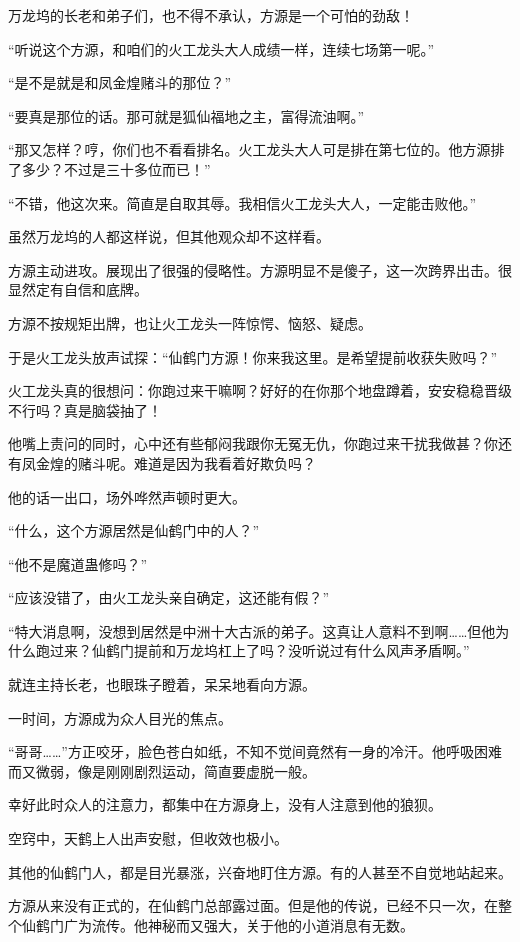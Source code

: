 \begin{this_body}
万龙坞的长老和弟子们，也不得不承认，方源是一个可怕的劲敌！

“听说这个方源，和咱们的火工龙头大人成绩一样，连续七场第一呢。”

“是不是就是和凤金煌赌斗的那位？”

“要真是那位的话。那可就是狐仙福地之主，富得流油啊。”

“那又怎样？哼，你们也不看看排名。火工龙头大人可是排在第七位的。他方源排了多少？不过是三十多位而已！”

“不错，他这次来。简直是自取其辱。我相信火工龙头大人，一定能击败他。”

虽然万龙坞的人都这样说，但其他观众却不这样看。

方源主动进攻。展现出了很强的侵略性。方源明显不是傻子，这一次跨界出击。很显然定有自信和底牌。

方源不按规矩出牌，也让火工龙头一阵惊愕、恼怒、疑虑。

于是火工龙头放声试探：“仙鹤门方源！你来我这里。是希望提前收获失败吗？”

火工龙头真的很想问：你跑过来干嘛啊？好好的在你那个地盘蹲着，安安稳稳晋级不行吗？真是脑袋抽了！

他嘴上责问的同时，心中还有些郁闷我跟你无冤无仇，你跑过来干扰我做甚？你还有凤金煌的赌斗呢。难道是因为我看着好欺负吗？

他的话一出口，场外哗然声顿时更大。

“什么，这个方源居然是仙鹤门中的人？”

“他不是魔道蛊修吗？”

“应该没错了，由火工龙头亲自确定，这还能有假？”

“特大消息啊，没想到居然是中洲十大古派的弟子。这真让人意料不到啊……但他为什么跑过来？仙鹤门提前和万龙坞杠上了吗？没听说过有什么风声矛盾啊。”

就连主持长老，也眼珠子瞪着，呆呆地看向方源。

一时间，方源成为众人目光的焦点。

“哥哥……”方正咬牙，脸色苍白如纸，不知不觉间竟然有一身的冷汗。他呼吸困难而又微弱，像是刚刚剧烈运动，简直要虚脱一般。

幸好此时众人的注意力，都集中在方源身上，没有人注意到他的狼狈。

空窍中，天鹤上人出声安慰，但收效也极小。

其他的仙鹤门人，都是目光暴涨，兴奋地盯住方源。有的人甚至不自觉地站起来。

方源从来没有正式的，在仙鹤门总部露过面。但是他的传说，已经不只一次，在整个仙鹤门广为流传。他神秘而又强大，关于他的小道消息有无数。


\end{this_body}
